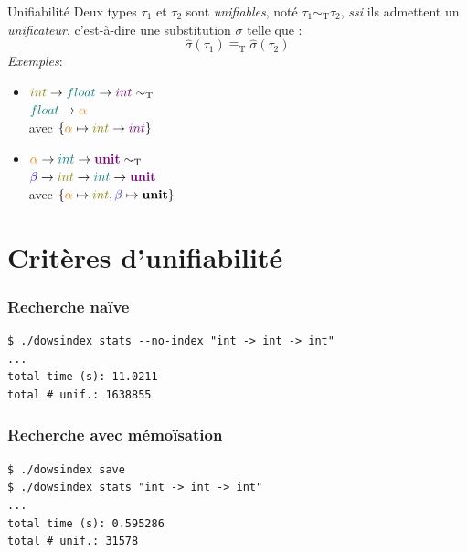 \documentclass[serif]{beamer}
\newcommand{\exemples}{\textit{Exemples}\xspace}
\newcommand{\ssi}{\textit{ssi}\xspace}
\newcommand{\unit}{\bold{unit}}
\newcommand{\T}{\mathrm{T}}
\begin{document}
\begin{frame}{Unifiabilité}
\small
Deux types $\tau_1$ et $\tau_2$ sont \emph{unifiables}, noté $\tau_1 \sim_\T \tau_2$, \ssi ils admettent un \emph{unificateur}, c'est-à-dire une substitution $\sigma$ telle que :
\[ \hat\sigma (\tau_1) \equiv_\T \hat\sigma (\tau_2) \]
\exemples :
\begin{itemize}
  \item
    $\textcolor{olive}{int} \rightarrow \textcolor{teal}{float} \rightarrow \textcolor{violet}{int} \sim_\T$ \\
    $\textcolor{teal}{float} \rightarrow \textcolor{orange}{\alpha}$ \\
    avec $\{ \textcolor{orange}{\alpha} \mapsto \textcolor{olive}{int} \rightarrow \textcolor{violet}{int} \}$
  \item
    $\textcolor{orange}{\alpha} \rightarrow \textcolor{teal}{int} \rightarrow \textcolor{violet}{\unit} \sim_\T$ \\
    $\textcolor{blue}{\beta} \rightarrow \textcolor{olive}{int} \rightarrow \textcolor{teal}{int} \rightarrow \textcolor{violet}{\unit}$ \\
    avec $\{ \textcolor{orange}{\alpha} \mapsto \textcolor{olive}{int}, \textcolor{blue}{\beta} \mapsto \unit \}$
\end{itemize}
\end{frame}


\section{Critères d'unifiabilité}


\begin{frame}[fragile=singleslide]\frametitle{Recherche naïve}
\begin{verbatim}
$ ./dowsindex stats --no-index "int -> int -> int"
...
total time (s): 11.0211
total # unif.: 1638855
\end{verbatim}
\end{frame}


\begin{frame}[fragile=singleslide]\frametitle{Recherche avec mémoïsation}
\begin{verbatim}
$ ./dowsindex save
$ ./dowsindex stats "int -> int -> int"
...
total time (s): 0.595286
total # unif.: 31578
\end{verbatim}
\end{frame}
\end{document}

